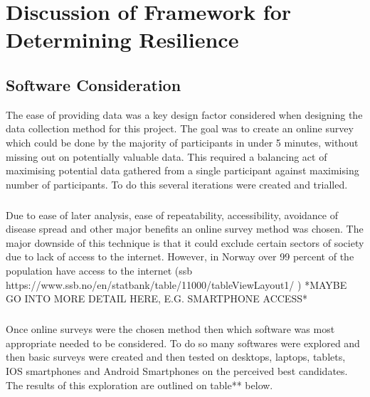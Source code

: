\chapter{Discussion of Framework for Determining Resilience}

\section{Software Consideration}

The ease of providing data was a key design factor considered when designing the data collection method for this project. The goal was to create an online survey which could be done by the majority of participants in under 5 minutes, without missing out on potentially valuable data. This required a balancing act of maximising potential data gathered from a single participant against maximising number of participants. To do this several iterations were created and trialled.
\paragraph{}
Due to ease of later analysis, ease of repeatability, accessibility,  avoidance of disease spread and other major benefits an online survey method was chosen. The major downside of this technique is that it could exclude certain sectors of society due to lack of access to the internet. However, in Norway over 99 percent of the population have access to the internet (ssb https://www.ssb.no/en/statbank/table/11000/tableViewLayout1/ ) *MAYBE GO INTO MORE DETAIL HERE, E.G. SMARTPHONE ACCESS*
\paragraph{}
Once online surveys were the chosen method then which software was most appropriate needed to be considered. To do so many softwares were explored and then basic surveys were created and then tested on desktops, laptops, tablets, IOS smartphones and Android Smartphones on the perceived best candidates. The results of this exploration are outlined on table** below.

